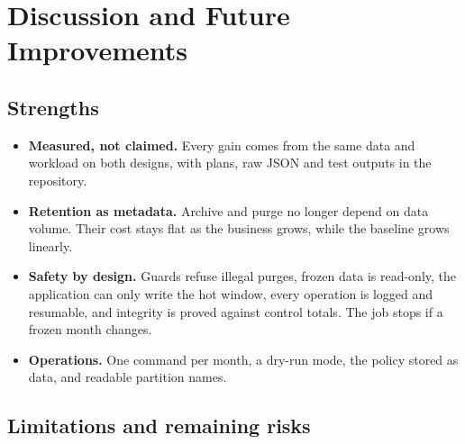 \chapter{Discussion and Future Improvements}\label{ch:discussion}

\section{Strengths}

\begin{itemize}
  \item \textbf{Measured, not claimed.} Every gain comes from the same data and workload on
        both designs, with plans, raw JSON and test outputs in the repository.
  \item \textbf{Retention as metadata.} Archive and purge no longer depend on data volume. Their
        cost stays flat as the business grows, while the baseline grows linearly.
  \item \textbf{Safety by design.} Guards refuse illegal purges, frozen data is read-only, the
        application can only write the hot window, every operation is logged and resumable,
        and integrity is proved against control totals. The job stops if a frozen month
        changes.
  \item \textbf{Operations.} One command per month, a dry-run mode, the policy stored as data,
        and readable partition names.
\end{itemize}

\section{Limitations and remaining risks}

